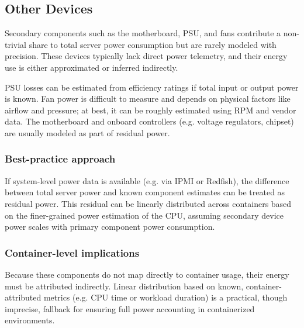 \subsection{Other Devices}

Secondary components such as the motherboard, PSU, and fans contribute a non-trivial share to total server power consumption but are rarely modeled with precision. These devices typically lack direct power telemetry, and their energy use is either approximated or inferred indirectly.

PSU losses can be estimated from efficiency ratings if total input or output power is known. Fan power is difficult to measure and depends on physical factors like airflow and pressure; at best, it can be roughly estimated using RPM and vendor data. The motherboard and onboard controllers (e.g. voltage regulators, chipset) are usually modeled as part of residual power.

\subsubsection{Best-practice approach}
If system-level power data is available (e.g. via IPMI or Redfish), the difference between total server power and known component estimates can be treated as residual power. This residual can be linearly distributed across containers based on the finer-grained power estimation of the CPU, assuming secondary device power scales with primary component power consumption.

\subsubsection{Container-level implications}
Because these components do not map directly to container usage, their energy must be attributed indirectly. Linear distribution based on known, container-attributed metrics (e.g. CPU time or workload duration) is a practical, though imprecise, fallback for ensuring full power accounting in containerized environments.